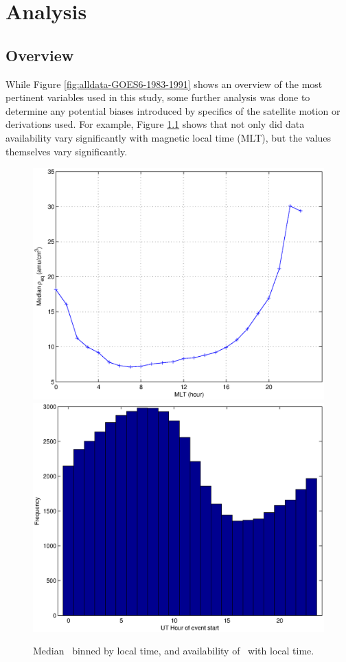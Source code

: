 \chapter[Analysis]{Analysis}

\section{Overview}
While Figure \ref{fig:alldata-GOES6-1983-1991} shows an overview of the most pertinent variables used in this study, some further analysis was done to determine any potential biases introduced by specifics of the satellite motion or derivations used. For example, Figure \ref{fig:ByHourExample} shows that not only did data availability vary significantly with magnetic local time (MLT), but the values themselves vary significantly. 

\begin{figure}
\centering
\includegraphics[width=0.7\linewidth]{Figures/rhoMLT.eps}
\includegraphics[width=0.7\linewidth]{Figures/nansbyhour.eps}
\caption{Median \req\ binned by local time, and availability of \req\ with local time. }
\label{fig:ByHourExample}
\end{figure}

